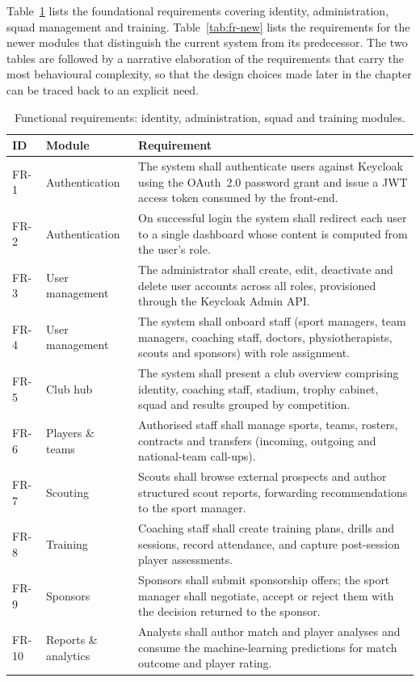 Table~\ref{tab:fr-core} lists the foundational requirements covering identity,
administration, squad management and training. Table~\ref{tab:fr-new} lists the
requirements for the newer modules that distinguish the current system from its
predecessor. The two tables are followed by a narrative elaboration of the
requirements that carry the most behavioural complexity, so that the design choices
made later in the chapter can be traced back to an explicit need.

\begin{table}[htbp]
\centering
\caption{Functional requirements: identity, administration, squad and training modules.}
\label{tab:fr-core}
\renewcommand{\arraystretch}{1.25}
\begin{tabular}{|p{}|p{}|p{}|}
\hline
\textbf{ID} & \textbf{Module} & \textbf{Requirement} \\
\hline
FR-1 & Authentication & The system shall authenticate users against Keycloak using the OAuth~2.0 password grant and issue a JWT access token consumed by the front-end. \\
\hline
FR-2 & Authentication & On successful login the system shall redirect each user to a single dashboard whose content is computed from the user's role. \\
\hline
FR-3 & User management & The administrator shall create, edit, deactivate and delete user accounts across all roles, provisioned through the Keycloak Admin API. \\
\hline
FR-4 & User management & The system shall onboard staff (sport managers, team managers, coaching staff, doctors, physiotherapists, scouts and sponsors) with role assignment. \\
\hline
FR-5 & Club hub & The system shall present a club overview comprising identity, coaching staff, stadium, trophy cabinet, squad and results grouped by competition. \\
\hline
FR-6 & Players \& teams & Authorised staff shall manage sports, teams, rosters, contracts and transfers (incoming, outgoing and national-team call-ups). \\
\hline
FR-7 & Scouting & Scouts shall browse external prospects and author structured scout reports, forwarding recommendations to the sport manager. \\
\hline
FR-8 & Training & Coaching staff shall create training plans, drills and sessions, record attendance, and capture post-session player assessments. \\
\hline
FR-9 & Sponsors & Sponsors shall submit sponsorship offers; the sport manager shall negotiate, accept or reject them with the decision returned to the sponsor. \\
\hline
FR-10 & Reports \& analytics & Analysts shall author match and player analyses and consume the machine-learning predictions for match outcome and player rating. \\
\hline
\end{tabular}
\end{table}

